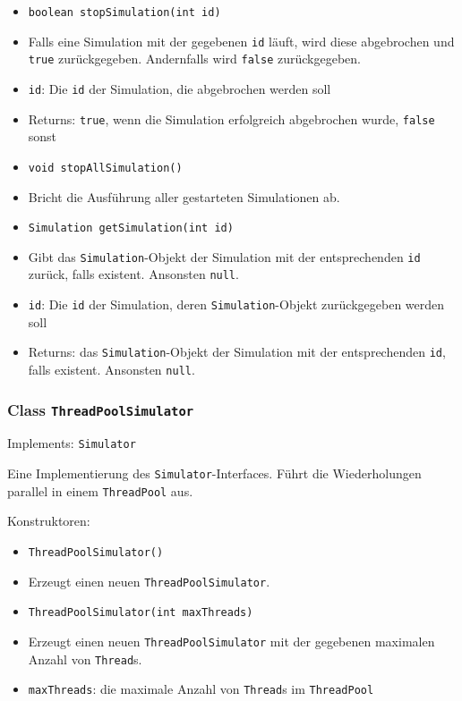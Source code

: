 \documentclass[parskip=full,11pt]{scrartcl}
\begin{document}
\begin{itemize}
\item \texttt{boolean stopSimulation(int id)}
\item[] Falls eine Simulation mit der gegebenen \texttt{id} läuft, wird diese abgebrochen und \texttt{true} zurückgegeben. Andernfalls wird \texttt{false} zurückgegeben.
\item[] \texttt{id}: Die \texttt{id} der Simulation, die abgebrochen werden soll
\item[] Returns: \texttt{true}, wenn die Simulation erfolgreich abgebrochen wurde, \texttt{false} sonst

\item \texttt{void stopAllSimulation()}
\item[] Bricht die Ausführung aller gestarteten Simulationen ab.

\item \texttt{Simulation getSimulation(int id)}
\item[] Gibt das \texttt{Simulation}-Objekt der Simulation mit der entsprechenden \texttt{id} zurück, falls existent. Ansonsten \texttt{null}.
\item[] \texttt{id}: Die \texttt{id} der Simulation, deren \texttt{Simulation}-Objekt zurückgegeben werden soll
\item[] Returns: das \texttt{Simulation}-Objekt der Simulation mit der entsprechenden \texttt{id}, falls existent. Ansonsten \texttt{null}.
\end{itemize}

\subsubsection{Class \texttt{ThreadPoolSimulator}}
Implements: \texttt{Simulator}

Eine Implementierung des \texttt{Simulator}-Interfaces. Führt die Wiederholungen parallel in einem \texttt{ThreadPool} aus.

Konstruktoren:
\begin{itemize}\itemsep -10pt
\item \texttt{ThreadPoolSimulator()}
\item[] Erzeugt einen neuen \texttt{ThreadPoolSimulator}.

\item \texttt{ThreadPoolSimulator(int maxThreads)}
\item[] Erzeugt einen neuen \texttt{ThreadPoolSimulator} mit der gegebenen maximalen Anzahl von \texttt{Thread}s.
\item[] \texttt{maxThreads}: die maximale Anzahl von \texttt{Thread}s im \texttt{ThreadPool}
\end{itemize}
\end{document}
